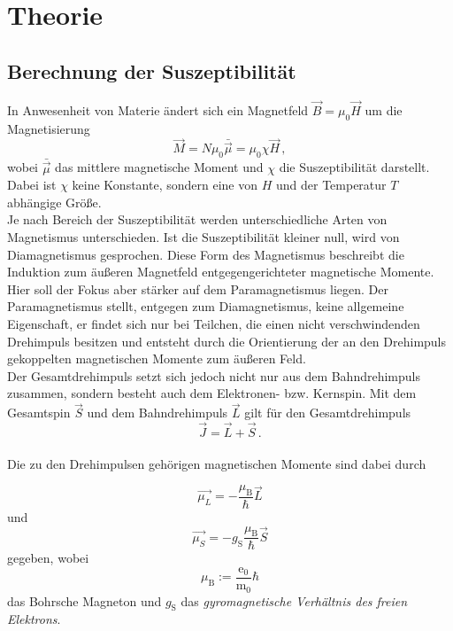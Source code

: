 \section{Theorie}
\label{sec:theorie}

\subsection{Berechnung der Suszeptibilität}

In Anwesenheit von Materie ändert sich ein Magnetfeld $\vec{B} = \mu_0 \vec{H}$ um die Magnetisierung
\begin{equation*}
    \vec{M} = N \mu_0 \bar{\vec{\mu}} = \mu_0 \chi \vec{H} \,,
\end{equation*}
wobei $\bar{\vec{\mu}}$ das mittlere magnetische Moment und $\chi$ die Suszeptibilität darstellt.
Dabei ist $\chi$ keine Konstante, sondern eine von $H$ und der Temperatur $T$ abhängige Größe. \\

Je nach Bereich der Suszeptibilität werden unterschiedliche Arten von Magnetismus unterschieden.
Ist die Suszeptibilität kleiner null, wird von Diamagnetismus gesprochen.
Diese Form des Magnetismus beschreibt die Induktion zum äußeren Magnetfeld entgegengerichteter magnetische Momente. \\

Hier soll der Fokus aber stärker auf dem Paramagnetismus liegen.
Der Paramagnetismus stellt, entgegen zum Diamagnetismus, keine allgemeine Eigenschaft, er findet sich nur bei
Teilchen, die einen nicht verschwindenden Drehimpuls besitzen und entsteht durch die Orientierung der an den
Drehimpuls gekoppelten magnetischen Momente zum äußeren Feld. \\

Der Gesamtdrehimpuls setzt sich jedoch nicht nur aus dem Bahndrehimpuls zusammen, sondern besteht auch dem
Elektronen- bzw. Kernspin.
Mit dem Gesamtspin $\vec{S}$ und dem Bahndrehimpuls $\vec{L}$ gilt für den Gesamtdrehimpuls
\begin{equation}
    \vec{J} = \vec{L} + \vec{S} \,.
\end{equation} \\

Die zu den Drehimpulsen gehörigen magnetischen Momente sind dabei durch

\begin{equation}
    \vec{\mu_L} = -\dfrac{\mu_\text{B}}{\hbar} \vec{L}
    \label{eq:magmomL}
\end{equation}
und
\begin{equation}
    \vec{\mu_S} = - g_\text{S} \dfrac{\mu_\text{B}}{\hbar} \vec{S}
\end{equation}
gegeben, wobei
\begin{equation*}
    \mu_\text{B} := \frac{\text{e}_0}{\text{m}_0} \hbar
\end{equation*}
das Bohrsche Magneton und $g_\text{S}$ das \textit{gyromagnetische Verhältnis des freien Elektrons}. \\

